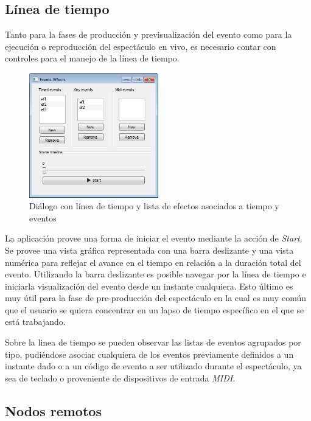 \subsection{Línea de tiempo}

Tanto para la fases de producción y previsualización del evento como para la ejecución o reproducción del espectáculo en vivo, es necesario contar con controles para el manejo de la línea de tiempo.

\begin{figure}[H]
  \centering
    \includegraphics[width=0.5\textwidth]{./Cap5_vmt/vmt_events_effects.png}
  \caption{Diálogo con línea de tiempo y lista de efectos asociados a tiempo y eventos}
  \label{fig:VMT-Timeline}
\end{figure}

La aplicación provee una forma de iniciar el evento mediante la acción de \emph{Start}. Se provee una vista gráfica representada con una barra deslizante y una vista numérica para reflejar el avance en el tiempo en relación a la duración total del evento. Utilizando la barra deslizante es posible navegar por la línea de tiempo e iniciarla visualización del evento desde un instante cualquiera. Esto último es muy útil para la fase de pre-producción del espectáculo en la cual es muy común que el usuario se quiera concentrar en un lapso de tiempo específico en el que se está trabajando.

Sobre la linea de tiempo se pueden observar las listas de eventos agrupados por tipo, pudiéndose asociar cualquiera de los eventos previamente definidos a un instante dado o a un código de evento a ser utilizado durante el espectáculo, ya sea de teclado o proveniente de dispositivos de entrada \emph{MIDI}.

\subsection{Nodos remotos}

